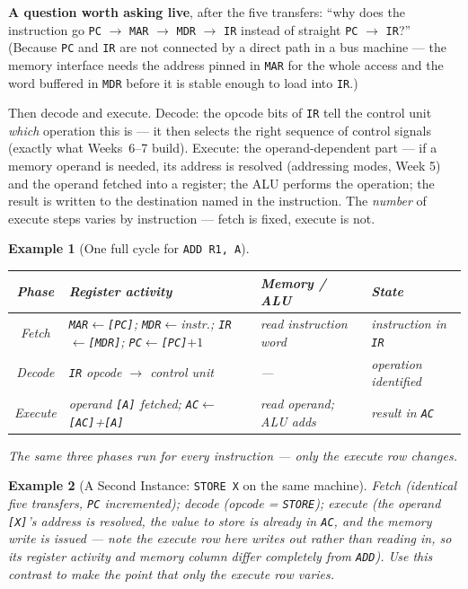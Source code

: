 \documentclass[11pt]{article}
\newtheorem{example}{Example}[section]
\begin{document}
\textbf{A question worth asking live}, after the five transfers: ``why does the instruction go \texttt{PC} $\to$ \texttt{MAR} $\to$ \texttt{MDR} $\to$ \texttt{IR} instead of straight \texttt{PC} $\to$ \texttt{IR}?'' (Because \texttt{PC} and \texttt{IR} are not connected by a direct path in a bus machine --- the memory interface needs the address pinned in \texttt{MAR} for the whole access and the word buffered in \texttt{MDR} before it is stable enough to load into \texttt{IR}.)

Then decode and execute. Decode: the opcode bits of \texttt{IR} tell the control unit \emph{which} operation this is --- it then selects the right sequence of control signals (exactly what Weeks~6--7 build). Execute: the operand-dependent part --- if a memory operand is needed, its address is resolved (addressing modes, Week 5) and the operand fetched into a register; the ALU performs the operation; the result is written to the destination named in the instruction. The \emph{number} of execute steps varies by instruction --- fetch is fixed, execute is not.

\begin{example}[One full cycle for \texttt{ADD R1, A}]
\begin{center}
\small
\begin{tabular}{@{}cp{3.4cm}p{3.6cm}p{3.4cm}@{}}
\toprule
\textbf{Phase} & \textbf{Register activity} & \textbf{Memory / ALU} & \textbf{State} \\
\midrule
Fetch &
  \texttt{MAR}$\gets$\texttt{[PC]}; \texttt{MDR}$\gets$instr.; \texttt{IR}$\gets$\texttt{[MDR]}; \texttt{PC}$\gets$\texttt{[PC]}$+1$ &
  read instruction word &
  instruction in \texttt{IR} \\
Decode &
  \texttt{IR} opcode $\to$ control unit &
  --- &
  operation identified \\
Execute &
  operand \texttt{[A]} fetched; \texttt{AC}$\gets$\texttt{[AC]}+\texttt{[A]} &
  read operand; ALU adds &
  result in \texttt{AC} \\
\bottomrule
\end{tabular}
\end{center}
The same three phases run for every instruction --- only the execute row changes.
\end{example}

\begin{example}[A Second Instance: \texttt{STORE X} on the same machine]
Fetch (identical five transfers, \texttt{PC} incremented); decode (opcode = \texttt{STORE}); execute (the operand \texttt{[X]}'s \emph{address} is resolved, the value to store is already in \texttt{AC}, and the memory write is issued --- note the execute row here writes \emph{out} rather than reading in, so its register activity and memory column differ completely from \texttt{ADD}). Use this contrast to make the point that only the execute row varies.
\end{example}
\end{document}
